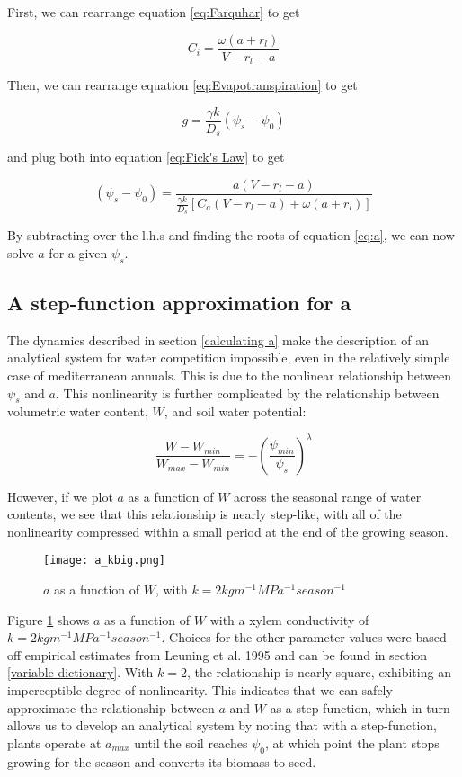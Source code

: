 \documentclass{article}
\begin{document}
  First, we can rearrange equation \ref{eq:Farquhar} to get

  $$C_{i} =  \frac{\omega(a + r_{l})}{V - r_{l} - a}$$

  Then, we can rearrange equation \ref{eq:Evapotranspiration} to get

  $$g = \frac{\gamma k}{D_{s}} (\psi_{s} - \psi_{0})$$

  and plug both into equation \ref{eq:Fick's Law} to get

  \begin{equation} \label{eq:a}
    (\psi_{s} - \psi_{0}) = \frac{a( V - r_{l} - a)}{\frac{\gamma k}{D_{s}} [C_{a}(V - r_{l} - a) + \omega(a + r_{l}) ]}
  \end{equation}

  By subtracting over the l.h.s and finding
  the roots of equation \ref{eq:a}, we can now solve $a$ for a given $\psi_{s}$.

  \subsection{A step-function approximation for a}

  The dynamics described in section \ref{calculating a} make the description of
  an analytical system for water competition impossible, even in the relatively
  simple case of mediterranean annuals. This is due to the nonlinear
  relationship between $\psi_{s}$ and $a$. This nonlinearity is further
  complicated by the relationship between volumetric water content, $W$, and
  soil water potential:

  \begin{equation} \label{Wfun}
    \frac{W - W_{min}}{W_{max} - W_{min}} = - \left( \frac{\psi_{min}}{\psi_{s}} \right)^{\lambda}
  \end{equation}

  However, if we plot $a$ as a function of $W$ across the seasonal range of water
  contents, we see that this relationship is nearly step-like, with all
  of the nonlinearity compressed within a small period at the end of the growing season.

  \begin{figure}[h]
    \caption{$a$ as a function of $W$, with $k = 2 kg m^{-1} MPa^{-1} season^{-1}$}
    \centering
    \texttt{[image: a\_kbig.png]}
    \label{fig:a2}
  \end{figure}

  Figure \ref{fig:a2} shows $a$ as a function of $W$ with a xylem
  conductivity of $k = 2 kg m^{-1} MPa^{-1} season^{-1}$. Choices for the other parameter
  values were based off empirical estimates from Leuning et al. 1995 and can be
  found in section \ref{variable dictionary}. With $k = 2$, the relationship is
  nearly square, exhibiting an imperceptible degree of nonlinearity. This
  indicates that we can safely approximate the relationship between $a$ and
  $W$ as a step function, which in turn allows us to develop an analytical
  system by noting that with a step-function, plants operate at $a_{max}$ until the soil reaches
  $\psi_{0}$, at which point the plant stops growing for the season and converts
  its biomass to seed.
\end{document}
